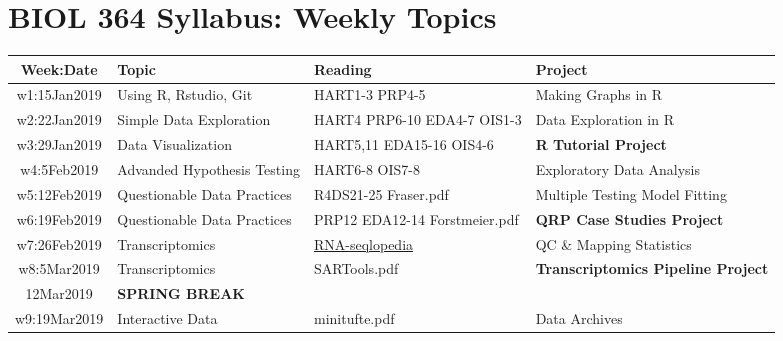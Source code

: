 \documentclass[11pt]{article} %
\begin{document}
\section{BIOL 364 Syllabus: Weekly Topics}
\begin{table}[ht] 
	\centering %
	\begin{tabular}{| c | p{5cm} | p{3cm} | p{5.5cm} |} %
	\hline %
	{\bf Week:Date} & {\bf Topic} & {\bf Reading} & {\bf Project}  \\ %
	\hline 
	\hline %
  w1:15Jan2019 & Using R, Rstudio, Git & HART1-3 \newline PRP4-5 & Making Graphs in R \\ %
	\hline
	w2:22Jan2019 & Simple Data Exploration & HART4 \newline PRP6-10 \newline EDA4-7 \newline OIS1-3 & Data Exploration in R \\ 
	\hline
	w3:29Jan2019 & Data Visualization & HART5,11 \newline EDA15-16 \newline OIS4-6 & {\bf R Tutorial Project}\\ 
	\hline 
	w4:5Feb2019 & Advanded Hypothesis Testing & HART6-8 \newline OIS7-8 & Exploratory Data Analysis \\ 
	\hline 
	w5:12Feb2019 & Questionable Data Practices & R4DS21-25 \newline Fraser.pdf & Multiple Testing \newline Model Fitting \\ 
	\hline 
	w6:19Feb2019 & Questionable Data Practices & PRP12 \newline EDA12-14 \newline Forstmeier.pdf & {\bf QRP Case Studies Project} \\ 
	\hline 
	w7:26Feb2019 & Transcriptomics & \href{https://rnaseq.uoregon.edu/}{RNA-seqlopedia} & QC \& Mapping Statistics\\ 
	\hline 
	w8:5Mar2019 & Transcriptomics  & SARTools.pdf & {\bf Transcriptomics Pipeline Project}\\ 
	\hline 
	12Mar2019 & {\bf SPRING BREAK} &  &  \\ 
	\hline
	w9:19Mar2019 & Interactive Data & minitufte.pdf & Data Archives \newline {\bf TAKEHOME MIDTERM} \\ 

\end{tabular}
\end{table}
\end{document}
